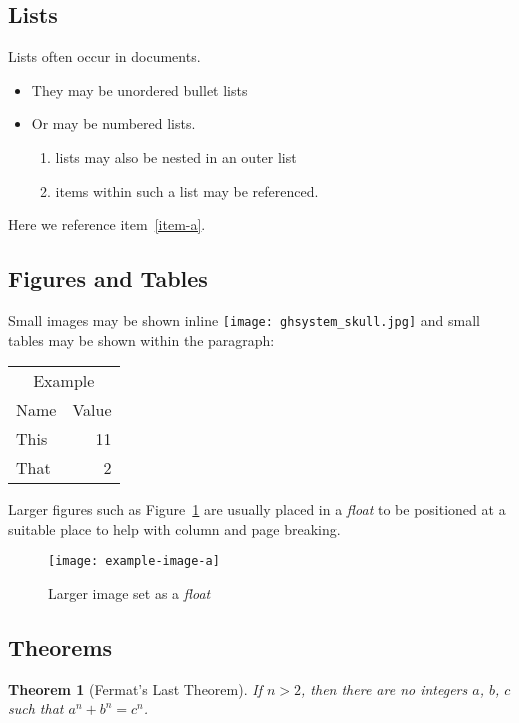 \documentclass[a4paper,twocolumn]{article}
\newtheorem{theorem}{Theorem}
\providecommand\tagpdfsetup[1]{}
\begin{document}
\subsection{Lists}
Lists often occur in documents.
\begin{itemize}
\item They may be unordered bullet lists
\item Or may be numbered lists.
  \begin{enumerate}
  \item lists may also be nested in an outer list
  \item \label{item-a}items within such a list may be referenced.
  \end{enumerate}
\end{itemize}
Here we reference item~\ref{item-a}.

\subsection{Figures and Tables}

Small images may be shown inline
\texttt{[image: ghsystem\_skull.jpg]}
and small tables may be shown within the paragraph:
\begin{center}
\tagpdfsetup{table/header-rows={1,2}}
\begin{tabular}{lr}
\multicolumn{2}{c}{Example}\\
Name&Value\\
This& 11 \\
That & 2
\end{tabular}
\end{center}

Larger
figures such as Figure~\ref{float} are usually placed in a
\emph{float} to be positioned at a suitable place to help with column
and page breaking.
\begin{figure}
  \centering
  \texttt{[image: example-image-a]}
  \caption{\label{float}Larger image set as a \emph{float}}
\end{figure}

\subsection{Theorems}

\begin{theorem}[Fermat's Last Theorem]
 
\noindent
If $n>2$, then there are no integers $a$, $b$, $c$ such that $a^n+b^n=c^n$.
\end{theorem}
\end{document}
